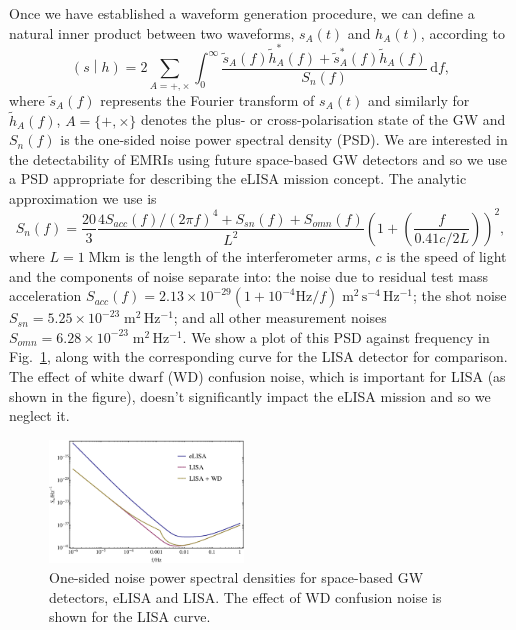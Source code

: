 \documentclass[aps,prd,amsfonts,amssymb,amsmath,nofootinbib,reprint,showpacs]{revtex4}
\newcommand{\figref}[1]{Fig.\ \ref{fig:#1}}
\newcommand{\dd}{\ensuremath{\mathrm{d}}}
\newcommand{\intd}[4]{\ensuremath{\int_{#1}^{#2}{#3}\,\dd{#4}}}
\newcommand{\overlap}[2]{\ensuremath{\left(#1\middle|#2\right)}}
\begin{document}
Once we have established a waveform generation procedure, we can define a natural inner product between two waveforms, $s_A(t)$ and $h_A(t)$, according to
\begin{equation}
\label{eq:innerprod}
\overlap{s}{h} = 2 \sum_{A=+,\times}\intd{0}{\infty}{\frac{\tilde{s}_A(f)\tilde{h}_A^*(f)+\tilde{s}_A^*(f)\tilde{h}_A(f)}{S_n(f)}}{f},
\end{equation}
where $\tilde{s}_A(f)$ represents the Fourier transform of $s_A(t)$ and similarly for $\tilde{h}_A(f)$, $A = \{+,\times\}$ denotes the plus- or cross-polarisation state of the GW and $S_n(f)$ is the one-sided noise power spectral density (PSD). We are interested in the detectability of EMRIs using future space-based GW detectors and so we use a PSD appropriate for describing the eLISA mission concept. The analytic approximation we use is~\cite{Amaro-Seoane2012a}
\begin{equation}
S_n(f) = \frac{20}{3}\frac{4 S_{acc}(f)/(2\pi f)^4 + S_{sn}(f) + S_{omn}(f)}{L^2} \left(1+\left(\frac{f}{0.41 c/2L}\right)\right)^2,
\end{equation}
where $L = 1\;\mathrm{Mkm}$ is the length of the interferometer arms, $c$ is the speed of light and the components of noise separate into: the noise due to residual test mass acceleration $S_{acc}(f) = 2.13\times10^{-29}(1+10^{-4}\mathrm{Hz}/f)\;\mathrm{m^2\,s^{-4}\,Hz^{-1}}$; the shot noise $S_{sn} = 5.25\times10^{-23}\;\mathrm{m^2\,Hz^{-1}}$; and all other measurement noises $S_{omn} = 6.28\times10^{-23}\;\mathrm{m^2\,Hz^{-1}}$. We show a plot of this PSD against frequency in \figref{noise-curves}, along with the corresponding curve for the LISA detector for comparison. The effect of white dwarf (WD) confusion noise, which is important for LISA (as shown in the figure), doesn't significantly impact the eLISA mission and so we neglect it.

\begin{figure}[htbp]
\centering
\includegraphics[width=0.46\textwidth]{Fig_noise_curves}
\caption{\label{fig:noise-curves}One-sided noise power spectral densities for space-based GW detectors, eLISA and LISA. The effect of WD confusion noise is shown for the LISA curve.}
\end{figure}
\end{document}
